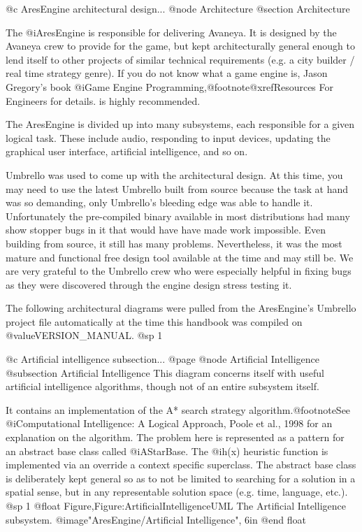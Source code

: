 @c AresEngine architectural design...
@node Architecture
@section Architecture

The @i{AresEngine} is responsible for delivering Avaneya. It is designed by the Avaneya crew to provide for the game, but kept architecturally general enough to lend itself to other projects of similar technical requirements (e.g. a city builder / real time strategy genre). If you do not know what a game engine is, Jason Gregory's book @i{Game Engine Programming},@footnote{@xref{Resources For Engineers} for details.} is highly recommended.

The AresEngine is divided up into many subsystems, each responsible for a given logical task. These include audio, responding to input devices, updating the graphical user interface, artificial intelligence, and so on.

Umbrello was used to come up with the architectural design. At this time, you may need to use the latest Umbrello built from source because the task at hand was so demanding, only Umbrello's bleeding edge was able to handle it. Unfortunately the pre-compiled binary available in most distributions had many show stopper bugs in it that would have have made work impossible. Even building from source, it still has many problems. Nevertheless, it was the most mature and functional free design tool available at the time and may still be. We are very grateful to the Umbrello crew who were especially helpful in fixing bugs as they were discovered through the engine design stress testing it.

The following architectural diagrams were pulled from the AresEngine's Umbrello project file automatically at the time this handbook was compiled on @value{VERSION_MANUAL}.
@sp 1

@c Artificial intelligence subsection...
@page
@node Artificial Intelligence
@subsection Artificial Intelligence
This diagram concerns itself with useful artificial intelligence algorithms, though not of an entire subsystem itself.

It contains an implementation of the A* search strategy algorithm.@footnote{See @i{Computational Intelligence: A Logical Approach}, Poole et al., 1998 for an explanation on the algorithm.} The problem here is represented as a pattern for an abstract base class called @i{AStarBase}. The @i{h(x)} heuristic function is implemented via an override a context specific superclass. The abstract base class is deliberately kept general so as to not be limited to searching for a solution in a spatial sense, but in any representable solution space (e.g. time, language, etc.).
@sp 1
@float Figure,Figure:ArtificialIntelligenceUML
The Artificial Intelligence subsystem.
@image{"AresEngine/Artificial Intelligence", 6in}
@end float

